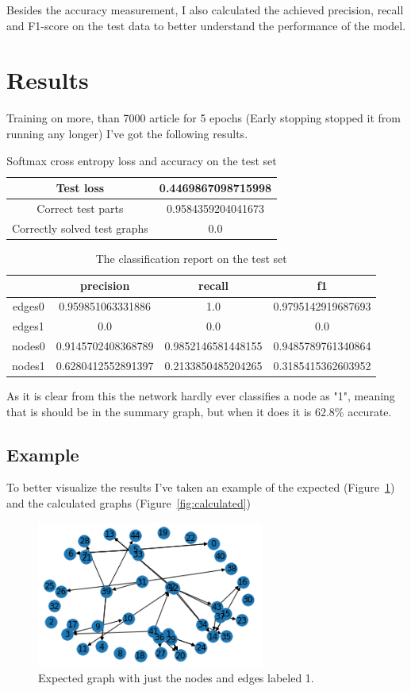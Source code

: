Besides the accuracy measurement, I also calculated the achieved precision, recall and F1-score on the test data to better understand the performance of the model.

\section{Results}
Training on more, than 7000 article for 5 epochs (Early stopping stopped it from running any longer) I've got the following results.
\begin{table}[!h]
	\centering
	\begin{tabular}{| c | c |}
		\hline
		Test loss & 0.4469867098715998 \\ \hline
		Correct test parts & 0.9584359204041673 \\ \hline
		Correctly solved test graphs & 0.0 \\ \hline
	\end{tabular}
	\caption{Softmax cross entropy loss and accuracy on the test set}
\end{table}

\begin{table}[!h]
	\centering
	\begin{tabular}{| c | c | c | c |}
		\hline
		 & precision & recall & f1 \\ \hline \hline
		edges0&0.959851063331886&1.0&0.9795142919687693  \\ \hline
		edges1 & 0.0 & 0.0 & 0.0 \\ \hline
		nodes0 & 0.9145702408368789 & 0.9852146581448155 & 0.9485789761340864 \\ \hline
		nodes1 & 0.6280412552891397 & 0.2133850485204265 & 0.3185415362603952 \\ \hline
	\end{tabular}
	\caption{The classification report on the test set}
\end{table}

As it is clear from this the network hardly ever classifies a node as "1", meaning that is should be in the summary graph, but when it does it is 62.8\% accurate.

\subsection{Example}
To better visualize the results I've taken an example of the expected (Figure~\ref{fig:expected}) and the calculated graphs (Figure~\ref{fig:calculated})

\begin{figure}[!ht]
	\centering
	\includegraphics[width=75mm, keepaspectratio]{figures/expected.png}
	\caption{Expected graph with just the nodes and edges labeled 1.}
	\label{fig:expected}
\end{figure}


